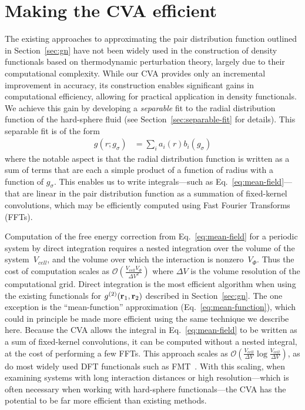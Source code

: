 \section{Making the CVA efficient}
\label{sec:efficient}
The existing approaches to approximating the pair distribution
function outlined in Section~\ref{sec:gn} have not been widely used in
the construction of density functionals based on thermodynamic
perturbation theory, largely due to their computational complexity.
While our CVA provides only an incremental improvement in accuracy,
its construction enables significant gains in computational
efficiency, allowing for practical application in density functionals.
We achieve this gain by developing a \emph{separable} fit to the radial
distribution function of the hard-sphere fluid (see
Section~\ref{sec:separable-fit} for details).  This separable fit is
of the form
\begin{align}
  g(r; g_\sigma) &= \sum_{i} a_i(r) b_i(g_\sigma)
\end{align}
where the notable aspect is that the radial distribution function is
written as a sum of terms that are each a simple product of a function
of radius with a function of $g_\sigma$.  This enables us to write
integrals---such as Eq.~\ref{eq:mean-field}---that are linear in the
pair distribution function as a summation of fixed-kernel
convolutions, which may be efficiently computed using Fast Fourier
Transforms (FFTs).

\newcommand\Vcell{V_{\textit{cell}}}
\newcommand\Vinteraction{V_{\Phi}}

Computation of the free energy correction from Eq.~\ref{eq:mean-field}
for a periodic system by direct integration requires a nested
integration over the volume of the system~$\Vcell$, and the volume
over which the interaction is nonzero~$\Vinteraction$.  Thus the cost
of computation scales as
$\mathcal{O}\left(\frac{\Vcell\Vinteraction}{\Delta V^2}\right)$ where
$\Delta V$ is the volume resolution of the computational grid.  Direct
integration is the most efficient algorithm when using the existing
functionals for $g^{(2)}(\textbf{r}_1,\textbf{r}_2)$ described in
Section~\ref{sec:gn}.  The one exception is the ``mean-function''
approximation (Eq.~\ref{eq:mean-function}), which could in principle
be made more efficient using the same technique we describe here.
Because the CVA allows the integral in Eq.~\ref{eq:mean-field} to be
written as a sum of fixed-kernel convolutions, it can be computed
without a nested integral, at the cost of performing a few FFTs.  This
approach scales as $\mathcal{O}\left(\frac{\Vcell}{\Delta
  V}\log\frac{\Vcell}{\Delta V}\right)$, as do most widely used DFT
functionals such as FMT~\cite{rosenfeld1989free, roth2002whitebear}.
%
With this scaling, when examining systems with long interaction
distances or high resolution---which is often necessary when working
with hard-sphere functionals---the CVA has the potential to be far
more efficient than existing methods.

